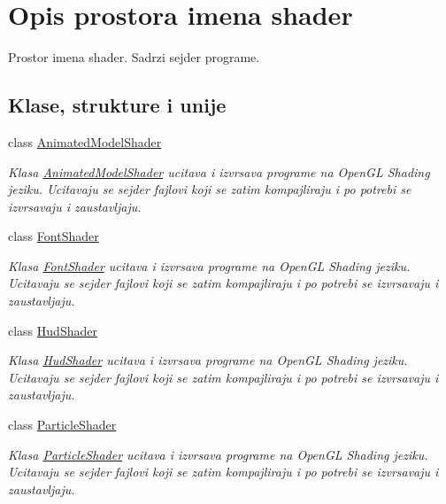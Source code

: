 \hypertarget{namespaceshader}{}\section{Opis prostora imena shader}
\label{namespaceshader}


Prostor imena shader. Sadrzi sejder programe.  


\subsection*{Klase, strukture i unije}
\begin{DoxyCompactItemize}
\item 
class \hyperlink{classshader_1_1AnimatedModelShader}{Animated\+Model\+Shader}
\begin{DoxyCompactList}\small\item\em Klasa \hyperlink{classshader_1_1AnimatedModelShader}{Animated\+Model\+Shader} ucitava i izvrsava programe na Open\+GL Shading jeziku. Ucitavaju se sejder fajlovi koji se zatim kompajliraju i po potrebi se izvrsavaju i zaustavljaju. \end{DoxyCompactList}\item 
class \hyperlink{classshader_1_1FontShader}{Font\+Shader}
\begin{DoxyCompactList}\small\item\em Klasa \hyperlink{classshader_1_1FontShader}{Font\+Shader} ucitava i izvrsava programe na Open\+GL Shading jeziku. Ucitavaju se sejder fajlovi koji se zatim kompajliraju i po potrebi se izvrsavaju i zaustavljaju. \end{DoxyCompactList}\item 
class \hyperlink{classshader_1_1HudShader}{Hud\+Shader}
\begin{DoxyCompactList}\small\item\em Klasa \hyperlink{classshader_1_1HudShader}{Hud\+Shader} ucitava i izvrsava programe na Open\+GL Shading jeziku. Ucitavaju se sejder fajlovi koji se zatim kompajliraju i po potrebi se izvrsavaju i zaustavljaju. \end{DoxyCompactList}\item 
class \hyperlink{classshader_1_1ParticleShader}{Particle\+Shader}
\begin{DoxyCompactList}\small\item\em Klasa \hyperlink{classshader_1_1ParticleShader}{Particle\+Shader} ucitava i izvrsava programe na Open\+GL Shading jeziku. Ucitavaju se sejder fajlovi koji se zatim kompajliraju i po potrebi se izvrsavaju i zaustavljaju. \end{DoxyCompactList}\item 

\end{DoxyCompactItemize}
